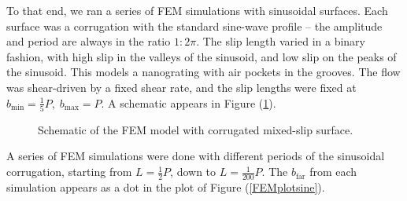 \documentclass[12pt, a4paper, twoside, openright]{book}
\newcommand{\bmin}{\ensuremath{b_{\mathrm{min}}}}
\newcommand{\bmax}{\ensuremath{b_{\mathrm{max}}}}
\newcommand{\bfar}{\ensuremath{b_{\mathrm{far}}}}
\begin{document}
To that end, we ran a series of FEM simulations with sinusoidal surfaces. Each surface was a corrugation with the standard sine-wave profile -- the amplitude and period are always in the ratio $1:2\pi$.  The slip length varied in a binary fashion, with high slip in the valleys of the sinusoid, and low slip on the peaks of the sinusoid.  This models a nanograting with air pockets in the grooves.  The flow was shear-driven by a fixed shear rate, and the slip lengths were fixed at $\bmin = \frac{1}{5} P, \; \bmax = P$.  A schematic appears in Figure (\ref{FEMroughmodel}).

\begin{figure}[ht]
\centering
{}
\caption{Schematic of the FEM model with corrugated mixed-slip surface.}\label{FEMroughmodel}
\end{figure}

A series of FEM simulations were done with different periods of the sinusoidal corrugation, starting from $L = \frac{1}{2}P$, down to $L = \frac{1}{200}P$. The $\bfar$ from each simulation appears as a dot in the plot of Figure (\ref{FEMplotsine}).
\end{document}
